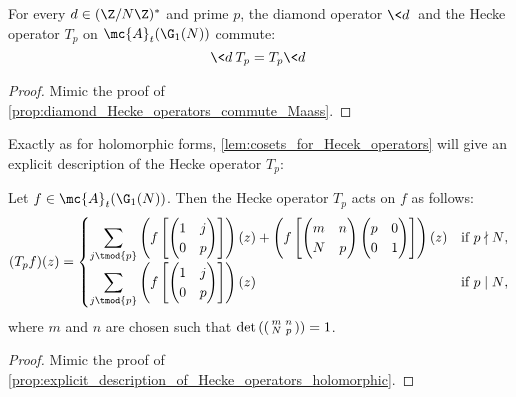     \begin{proposition}\label{prop:diamond_Hecke_operators_commute_Maass}
      For every $d \in (\Z/N\Z)^{\ast}$ and prime $p$, the diamond operator $\<d\>$ and the Hecke operator $T_{p}$ on $\mc{A}_{t}(\G_{1}(N))$ commute:
      \[
        \<d\>T_{p} = T_{p}\<d\>
      \]
    \end{proposition}
    \begin{proof}
      Mimic the proof of \cref{prop:diamond_Hecke_operators_commute_Maass}.
    \end{proof}

    Exactly as for holomorphic forms, \cref{lem:cosets_for_Hecek_operators} will give an explicit description of the Hecke operator $T_{p}$:

    \begin{proposition}\label{prop:explicit_description_of_Hecke_operators_Maass}
      Let $f \in \mc{A}_{t}(\G_{1}(N))$. Then the Hecke operator $T_{p}$ acts on $f$ as follows:
      \[
        (T_{p}f)(z) = \begin{cases} \displaystyle{\sum_{j \tmod{p}}}\left(f\left[\begin{pmatrix} 1 & j \\ 0 & p \end{pmatrix}\right]\right)(z)+\left(f\left[\begin{pmatrix} m & n \\ N & p \end{pmatrix}\begin{pmatrix} p & 0 \\ 0 & 1 \end{pmatrix}\right]\right)(z) & \text{if $p \nmid N$}, \\ \displaystyle{\sum_{j \tmod{p}}}\left(f\left[\begin{pmatrix} 1 & j \\ 0 & p \end{pmatrix}\right]\right)(z) & \text{if $p \mid N$}, \end{cases}
      \]
      where $m$ and $n$ are chosen such that $\det\left(\begin{psmallmatrix} m & n \\ N & p \end{psmallmatrix}\right) = 1$.
    \end{proposition}
    \begin{proof}
      Mimic the proof of \cref{prop:explicit_description_of_Hecke_operators_holomorphic}.
    \end{proof}

